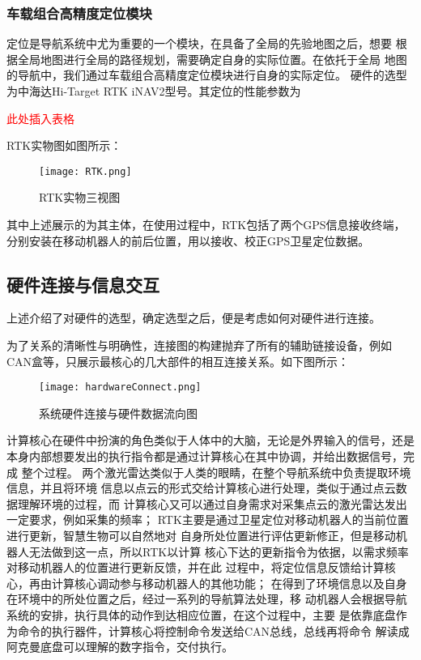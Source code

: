 \subsubsection{车载组合高精度定位模块}
定位是导航系统中尤为重要的一个模块，在具备了全局的先验地图之后，想要
根据全局地图进行全局的路径规划，需要确定自身的实际位置。在依托于全局
地图的导航中，我们通过车载组合高精度定位模块进行自身的实际定位。
硬件的选型为中海达Hi-Target RTK iNAV2型号。其定位的性能参数为

\textcolor{red}{此处插入表格}

RTK实物图如图所示：
\begin{figure}[ht]
    \centering
    \texttt{[image: RTK.png]}
    \caption{RTK实物三视图}
\end{figure}

其中上述展示的为其主体，在使用过程中，RTK包括了两个GPS信息接收终端，
分别安装在移动机器人的前后位置，用以接收、校正GPS卫星定位数据。



\subsection{硬件连接与信息交互}
上述介绍了对硬件的选型，确定选型之后，便是考虑如何对硬件进行连接。

为了关系的清晰性与明确性，连接图的构建抛弃了所有的辅助链接设备，例如
CAN盒等，只展示最核心的几大部件的相互连接关系。如下图所示：

\begin{figure}[ht]
    \centering
    \texttt{[image: hardwareConnect.png]}
    \caption{系统硬件连接与硬件数据流向图}
\end{figure}

计算核心在硬件中扮演的角色类似于人体中的大脑，无论是外界输入的信号，还是
本身内部想要发出的执行指令都是通过计算核心在其中协调，并给出数据信号，完成
整个过程。
两个激光雷达类似于人类的眼睛，在整个导航系统中负责提取环境信息，并且将环境
信息以点云的形式交给计算核心进行处理，类似于通过点云数据理解环境的过程，而
计算核心又可以通过自身需求对采集点云的激光雷达发出一定要求，例如采集的频率；
RTK主要是通过卫星定位对移动机器人的当前位置进行更新，智慧生物可以自然地对
自身所处位置进行评估更新修正，但是移动机器人无法做到这一点，所以RTK以计算
核心下达的更新指令为依据，以需求频率对移动机器人的位置进行更新反馈，并在此
过程中，将定位信息反馈给计算核心，再由计算核心调动参与移动机器人的其他功能；
在得到了环境信息以及自身在环境中的所处位置之后，经过一系列的导航算法处理，移
动机器人会根据导航系统的安排，执行具体的动作到达相应位置，在这个过程中，主要
是依靠底盘作为命令的执行器件，计算核心将控制命令发送给CAN总线，总线再将命令
解读成阿克曼底盘可以理解的数字指令，交付执行。

